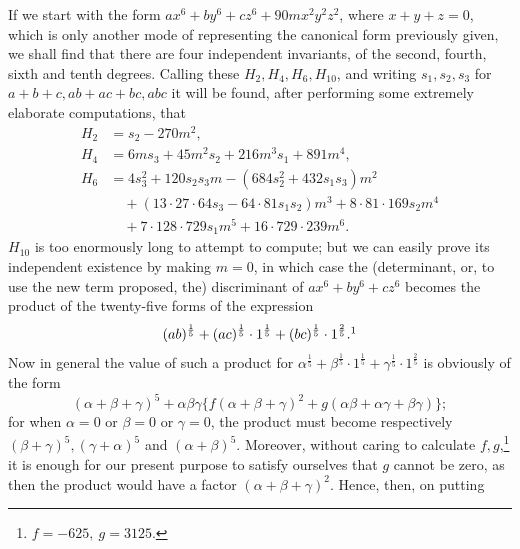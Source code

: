 \documentclass[11pt]{article}
\begin{document}
{{If we start with the form $ax^6+by^6+cz^6+90mx^2y^2z^2$, where $x+y+z=0$, which is only another mode of representing the canonical form previously given, we shall find that there are four independent invariants, of the second, fourth, sixth and tenth degrees. Calling these $H_2,H_4,H_6,H_{10}$, and writing $s_1,s_2,s_3$ for $a+b+c,ab+ac+bc,abc$ it will be found, after performing some extremely elaborate computations, that
\[
\begin{aligned}
H_2&=s_2-270m^2,\\
H_4&=6ms_3+45m^2s_2+216m^3s_1+891m^4,\\
H_6&=4s_3^2+120s_2s_3m-(684s_2^2+432s_1s_3)m^2\\
&\quad +(13\cdot27\cdot64s_3-64\cdot81s_1s_2)m^3+8\cdot81\cdot169s_2m^4\\
&\quad +7\cdot128\cdot729s_1m^5+16\cdot729\cdot239m^6.
\end{aligned}
\]
$H_{10}$ is too enormously long to attempt to compute; but we can easily prove its independent existence by making $m=0$, in which case the (determinant, or, to use the new term proposed, the) discriminant of $ax^6+by^6+cz^6$ becomes the product of the twenty-five forms of the expression
\[
(ab)^{\frac15}+(ac)^{\frac15}\cdot1^{\frac15}+(bc)^{\frac15}\cdot1^{\frac25}.\footnotemark
\]
Now in general the value of such a product for $\alpha^{\frac15}+\beta^{\frac15}\cdot1^{\frac15}+\gamma^{\frac15}\cdot1^{\frac25}$ is obviously of the form
\[
(\alpha+\beta+\gamma)^5+\alpha\beta\gamma\{f(\alpha+\beta+\gamma)^2+g(\alpha\beta+\alpha\gamma+\beta\gamma)\};
\]
for when $\alpha=0$ or $\beta=0$ or $\gamma=0$, the product must become respectively $(\beta+\gamma)^5,(\gamma+\alpha)^5$ and $(\alpha+\beta)^5$. Moreover, without caring to calculate $f,g$,\footnote{$f=-625,\ g=3125$.} it is enough for our present purpose to satisfy ourselves that $g$ cannot be zero, as then the product would have a factor $(\alpha+\beta+\gamma)^2$. Hence, then, on putting
}}
\end{document}
